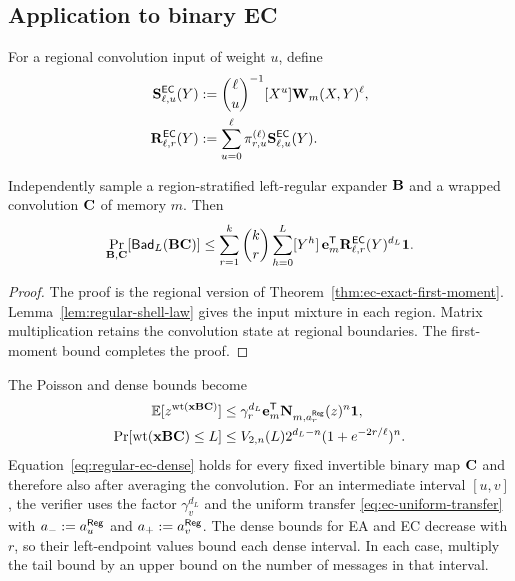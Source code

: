\subsection{Application to binary EC}

For a regional convolution input of weight $u$, define
\begin{align}
 \mathbf S^{\mathsf{EC}}_{\ell,u}(Y)
 &:=\binom{\ell}{u}^{-1}[X^u]\mathbf W_m(X,Y)^\ell,
 \label{eq:regular-ec-slice}\\
 \mathbf R^{\mathsf{EC}}_{\ell,r}(Y)
 &:=\sum_{u=0}^{\ell}\pi^{(\ell)}_{r,u}
 \mathbf S^{\mathsf{EC}}_{\ell,u}(Y).
 \label{eq:regular-ec-region}
\end{align}

\begin{theorem}
\label{thm:regular-ec-first-moment}
Independently sample a region-stratified left-regular expander $\mathbf B$ and a
wrapped convolution $\mathbf C$ of memory $m$.  Then
\begin{equation}
 \Pr_{\mathbf B,\mathbf C}[\mathsf{Bad}_L(\mathbf B\mathbf C)]\leq
 \sum_{r=1}^{k}\binom{k}{r}\sum_{h=0}^{L}[Y^h]\,
 \mathbf e_m^{\mathsf T}
 \mathbf R^{\mathsf{EC}}_{\ell,r}(Y)^{d_L}\mathbf 1.
 \label{eq:regular-ec-first-moment}
\end{equation}
\end{theorem}

\begin{proof}
The proof is the regional version of
Theorem~\ref{thm:ec-exact-first-moment}.  Lemma~\ref{lem:regular-shell-law}
gives the input mixture in each region.  Matrix multiplication retains the
convolution state at regional boundaries.  The first-moment bound completes
the proof.
\end{proof}

The Poisson and dense bounds become
\begin{align}
 \mathbb E[z^{\operatorname{wt}(\mathbf x\mathbf B\mathbf C)}]
 &\leq\gamma_r^{d_L}
 \mathbf e_m^{\mathsf T}\mathbf N_{m,a^{\mathsf{Reg}}_r}(z)^n\mathbf 1,
 \label{eq:regular-ec-poisson}\\
 \Pr[\operatorname{wt}(\mathbf x\mathbf B\mathbf C)\leq L]
 &\leq V_{2,n}(L)2^{d_L-n}(1+e^{-2r/\ell})^n.
 \label{eq:regular-ec-dense}
\end{align}
Equation~\eqref{eq:regular-ec-dense} holds for every fixed invertible binary
map $\mathbf C$ and therefore also after averaging the convolution.
For an intermediate interval $[u,v]$, the verifier uses the factor
$\gamma_v^{d_L}$ and the uniform transfer
\eqref{eq:ec-uniform-transfer} with
$a_-:=a^{\mathsf{Reg}}_u$ and $a_+:=a^{\mathsf{Reg}}_v$.
The dense bounds for EA and EC decrease with $r$, so their left-endpoint
values bound each dense interval.  In each case, multiply the tail bound
by an upper bound on the number of messages in that interval.

